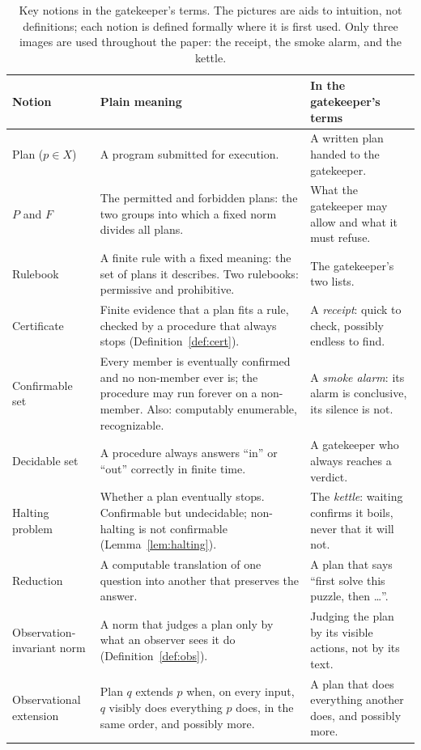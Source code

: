 \begin{table}[p]
\centering\small
\caption{Key notions in the gatekeeper's terms. The pictures are aids to intuition, not definitions; each notion is defined formally where it is first used. Only three images are used throughout the paper: the receipt, the smoke alarm, and the kettle.}
\label{tab:glossary}
\begin{tabularx}{\textwidth}{>{\raggedright\arraybackslash}p{2.9cm}Y>{\raggedright\arraybackslash}p{4.4cm}}
\toprule
Notion & Plain meaning & In the gatekeeper's terms\\
\midrule
Plan ($p\in X$) & A program submitted for execution. & A written plan handed to the gatekeeper.\\
$P$ and $F$ & The permitted and forbidden plans: the two groups into which a fixed norm divides all plans. & What the gatekeeper may allow and what it must refuse.\\
Rulebook & A finite rule with a fixed meaning: the set of plans it describes. Two rulebooks: permissive and prohibitive. & The gatekeeper's two lists.\\
Certificate & Finite evidence that a plan fits a rule, checked by a procedure that always stops (Definition~\ref{def:cert}). & A \emph{receipt}: quick to check, possibly endless to find.\\
Confirmable set & Every member is eventually confirmed and no non-member ever is; the procedure may run forever on a non-member. Also: computably enumerable, recognizable. & A \emph{smoke alarm}: its alarm is conclusive, its silence is not.\\
Decidable set & A procedure always answers ``in'' or ``out'' correctly in finite time. & A gatekeeper who always reaches a verdict.\\
Halting problem & Whether a plan eventually stops. Confirmable but undecidable; non-halting is not confirmable (Lemma~\ref{lem:halting}). & The \emph{kettle}: waiting confirms it boils, never that it will not.\\
Reduction & A computable translation of one question into another that preserves the answer. & A plan that says ``first solve this puzzle, then \ldots''.\\
Observation-invariant norm & A norm that judges a plan only by what an observer sees it do (Definition~\ref{def:obs}). & Judging the plan by its visible actions, not by its text.\\
Observational extension & Plan $q$ extends $p$ when, on every input, $q$ visibly does everything $p$ does, in the same order, and possibly more. & A plan that does everything another does, and possibly more.\\

\end{tabularx}
\end{table}
